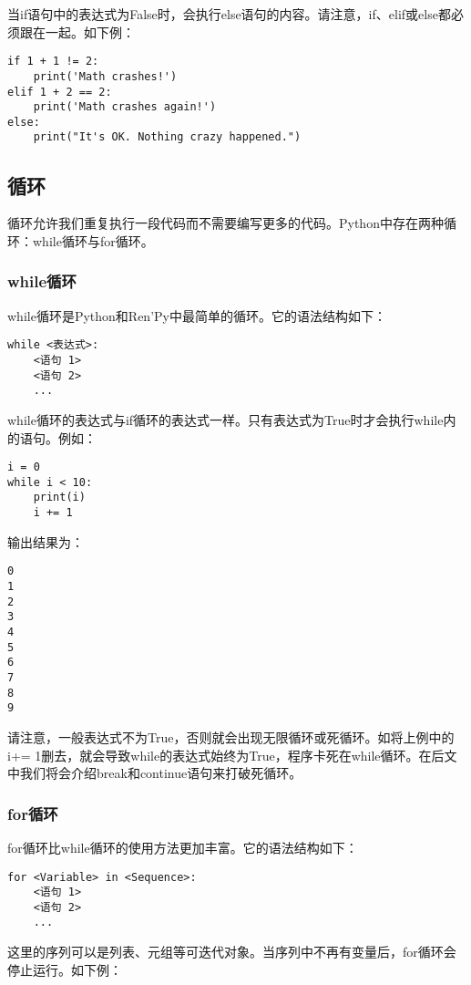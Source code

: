当if语句中的表达式为False时，会执行else语句的内容。请注意，if、elif或else都必须跟在一起。如下例：

\begin{lstlisting}
if 1 + 1 != 2:
    print('Math crashes!')
elif 1 + 2 == 2:
    print('Math crashes again!')
else:
    print("It's OK. Nothing crazy happened.")
\end{lstlisting}

\subsection{循环}
循环允许我们重复执行一段代码而不需要编写更多的代码。Python中存在两种循环：while循环与for循环。

\subsubsection{while循环}
while循环是Python和Ren'Py中最简单的循环。它的语法结构如下：
\begin{lstlisting}
while <表达式>:
    <语句 1>
    <语句 2>
    ...
\end{lstlisting}

while循环的表达式与if循环的表达式一样。只有表达式为True时才会执行while内的语句。例如：

\begin{lstlisting}
i = 0
while i < 10:
    print(i)
    i += 1
\end{lstlisting}

输出结果为：
\begin{lstlisting}
0
1
2
3
4
5
6
7
8
9
\end{lstlisting}

\begin{Warning}
    请注意，一般表达式不为True，否则就会出现无限循环或死循环。如将上例中的i+= 1删去，就会导致while的表达式始终为True，程序卡死在while循环。在后文中我们将会介绍break和continue语句来打破死循环。
\end{Warning}

\subsubsection{for循环\PyOnly }
for循环比while循环的使用方法更加丰富。它的语法结构如下：
\begin{lstlisting}
for <Variable> in <Sequence>:
    <语句 1>
    <语句 2>
    ...
\end{lstlisting}

这里的序列可以是列表、元组等可迭代对象。当序列中不再有变量后，for循环会停止运行。如下例：

